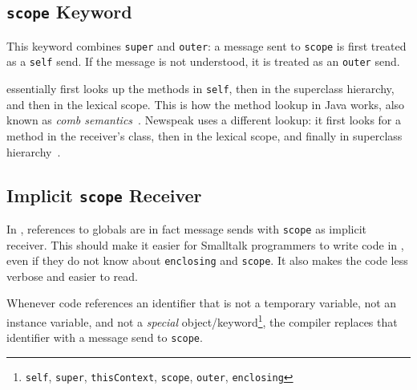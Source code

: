 

\subsection{\texttt{scope} Keyword}
This keyword combines \texttt{super} and \texttt{outer}: a message sent to \texttt{scope} is first treated as a \texttt{self} send. If the message is not understood, it is treated as an \texttt{outer} send.

\msname essentially first looks up the methods in \texttt{self}, then in the superclass hierarchy, and then in the lexical scope. This is how the method lookup in Java works, also known as \emph{comb semantics}~\cite{bracha2007interaction}. Newspeak uses a different lookup: it first looks for a method in the receiver's class, then in the lexical scope, and finally in superclass hierarchy~\cite{bracha:modules_as_objects}.


\subsection{Implicit \texttt{scope} Receiver}
\label{sec:con_implz_recv}
In \msname, references to globals are in fact message sends with \texttt{scope} as implicit receiver. This should make it easier for Smalltalk programmers to write code in \msname, even if they do not know about \texttt{enclosing} and \texttt{scope}. It also makes the code less verbose and easier to read.

Whenever code references an identifier that is not a temporary variable, not an instance variable, and not a \emph{special} object/keyword\footnote{\texttt{self}, \texttt{super}, \texttt{thisContext}, \texttt{scope}, \texttt{outer}, \texttt{enclosing}}, the compiler replaces that identifier with a message send to \texttt{scope}.

